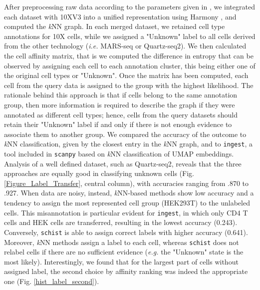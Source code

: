 \documentclass[10pt]{article}
\begin{document}
After preprocessing raw data according to the parameters given in \cite{mereu_2020}, we integrated each dataset with 10XV3 into a unified representation using Harmony \cite{Korsunsky_2019}, and computed the \emph{k}NN graph. In each merged dataset, we retained cell type annotations for 10X cells, while we assigned a "Unknown" label to all cells derived from the other technology (\emph{i.e.} MARS-seq or Quartz-seq2). We then calculated the cell affinity matrix, that is we computed the difference in entropy that can be observed by assigning each cell to each annotation cluster, this being either one of the original cell types or "Unknown". Once the matrix has been computed, each cell from the query data is assigned to the group with the highest likelihood. The rationale behind this approach is that if cells belong to the same annotation group, then more information is required to describe the graph if they were annotated as different cell types; hence, cells from the query datasets should retain their "Unknown" label if and only if there is not enough evidence to associate them to another group. We compared the accuracy of the  outcome to \emph{k}NN classification, given by the closest entry in the \emph{k}NN graph, and to \texttt{ingest}, a tool included in \texttt{scanpy}  based on \emph{k}NN classification of UMAP embeddings. Analysis of a well defined dataset, such as Quartz-seq2, reveals that the three approaches are equally good in classifying unknown cells (Fig. \ref{Figure_Label_Transfer}, central column), with accuracies ranging from .870 to .927. When data are noisy, instead, \emph{k}NN-based methods show low accuracy and a tendency to assign the most represented cell group (HEK293T) to the unlabeled cells. This misannotation is particular evident for \texttt{ingest}, in which only CD4 T cells and HEK cells are transferred, resulting in the lowest accuracy (0.243). Conversely, \texttt{schist} is able to assign correct labels with higher accuracy (0.641). Moreover, \emph{k}NN methods assign a label to each cell, whereas \texttt{schist} does not relabel cells if there are no sufficient evidence (\emph{e.g.} the "Unknown" state is the most likely). Interestingly, we found that for the largest part of cells without assigned label, the second choice by affinity ranking was indeed the appropriate one (Fig. \ref{hist_label_second}).
\end{document}
